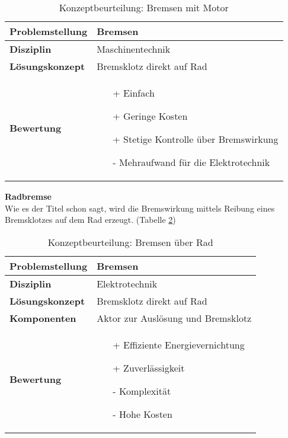 \documentclass[../../main.tex]{subfiles}
\begin{document}
    \begin{flushleft}
        \begin{table}[h]
        \begin{tabular}{ | l | p{11cm} |}
        \hline
        \textbf{Problemstellung} & Bremsen \\ \hline
        \textbf{Disziplin} & Maschinentechnik \\ \hline
        \textbf{Lösungskonzept} & Bremsklotz direkt auf Rad \\ \hline
        \textbf{Bewertung} &  \begin{itemize}
                                \item[+] Einfach
                                \item[+] Geringe Kosten
                                \item[+] Stetige Kontrolle über Bremswirkung 
                                \item[-] Mehraufwand für die Elektrotechnik 
                              \end{itemize} \\ \hline
        \end{tabular}
        \caption{Konzeptbeurteilung: Bremsen mit Motor}
        \label{tab:konzept_fahrwerk_motorbremse}
    \end{table}
    \end{flushleft}

    \textbf{Radbremse}\\
    Wie es der Titel schon sagt, wird die Bremswirkung mittels Reibung eines Bremsklotzes auf dem Rad erzeugt. (Tabelle \ref{tab:konzept_fahrwerk_radbremse})

\begin{flushleft}
    \begin{table}[h]
    \begin{tabular}{ | l | p{11cm} |}
    \hline
    \textbf{Problemstellung} & Bremsen \\ \hline
    \textbf{Disziplin} & Elektrotechnik \\ \hline
    \textbf{Lösungskonzept} & Bremsklotz direkt auf Rad \\ \hline
    \textbf{Komponenten} & Aktor zur Auslösung und Bremsklotz \\ \hline
    \textbf{Bewertung} &  \begin{itemize}
                            \item[+] Effiziente Energievernichtung
                            \item[+] Zuverlässigkeit
                            \item[-] Komplexität 
                            \item[-] Hohe Kosten
                          \end{itemize} \\ \hline
    \end{tabular}
    \caption{Konzeptbeurteilung: Bremsen über Rad}
    \label{tab:konzept_fahrwerk_radbremse}
\end{table}
\end{flushleft}
\end{document}
